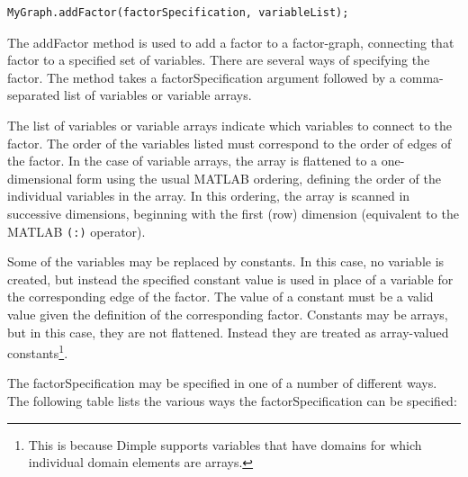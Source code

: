 \begin{lstlisting}
MyGraph.addFactor(factorSpecification, variableList);
\end{lstlisting}

The addFactor method is used to add a factor to a factor-graph, connecting that factor to a specified set of variables. There are several ways of specifying the factor.  The method takes a factorSpecification argument followed by a comma-separated list of variables or variable arrays.

The list of variables or variable arrays indicate which variables to connect to the factor.  The order of the variables listed must correspond to the order of edges of the factor.   \ifmatlab  In the case of variable arrays, the array is flattened to a one-dimensional form using the usual MATLAB ordering, defining the order of the individual variables in the array.  In this ordering, the array is scanned in successive dimensions, beginning with the first (row) dimension (equivalent to the MATLAB \texttt{(:)} operator). \fi

Some of the variables may be replaced by constants.  In this case, no variable is created, but instead the specified constant value is used in place of a variable for the corresponding edge of the factor.  The value of a constant must be a valid value given the definition of the corresponding factor.  \ifmatlab Constants may be arrays, but in this case, they are not flattened.  Instead they are treated as array-valued constants\footnote{This is because Dimple supports variables that have domains for which individual domain elements are arrays.}.  \fi

The factorSpecification may be specified in one of a number of different ways.  The following table lists the various ways the factorSpecification can be specified:

